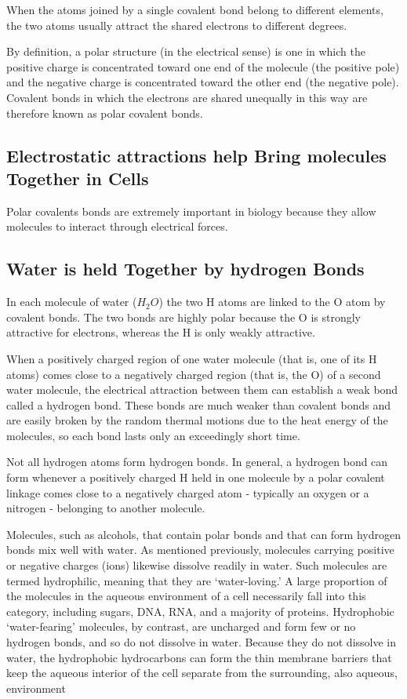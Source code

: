 When the atoms joined by a single covalent bond belong to different elements, 
the two atoms usually attract the shared electrons to different degrees.

By definition, a polar structure (in the electrical sense) is one in which the 
positive charge is concentrated toward
one end of the molecule (the positive pole) and the negative charge is
concentrated toward the other end (the negative pole). Covalent bonds
in which the electrons are shared unequally in this way are therefore
known as polar covalent bonds.

\subsection{Electrostatic attractions help Bring molecules Together in Cells}

Polar covalents bonds are extremely important in biology because they allow 
molecules to interact through electrical forces.

\subsection{Water is held Together by hydrogen Bonds}

In each molecule of water ($H_{2}O$) the two H atoms are linked to the O
atom by covalent bonds. The two bonds are highly polar because the O is
strongly attractive for electrons, whereas the H is only weakly attractive.

When a positively charged
region of one water molecule (that is, one of its H atoms) comes close to
a negatively charged region (that is, the O) of a second water molecule,
the electrical attraction between them can establish a weak bond called a
hydrogen bond. These bonds are much weaker than covalent bonds and
are easily broken by the random thermal motions due to the heat energy
of the molecules, so each bond lasts only an exceedingly short time.

Not all hydrogen atoms form hydrogen bonds. In general, a hydrogen
bond can form whenever a positively charged H held in one molecule by
a polar covalent linkage comes close to a negatively charged atom - typically 
an oxygen or a nitrogen - belonging to another molecule.

Molecules, such as alcohols, that contain polar bonds and that can form
hydrogen bonds mix well with water. As mentioned previously, molecules 
carrying positive or negative charges (ions) likewise dissolve
readily in water. Such molecules are termed hydrophilic, meaning that
they are ‘water-loving.’ A large proportion of the molecules in the aqueous 
environment of a cell necessarily fall into this category, including
sugars, DNA, RNA, and a majority of proteins. Hydrophobic ‘water-fearing’ 
molecules, by contrast, are uncharged and form few or no hydrogen
bonds, and so do not dissolve in water.
Because
they do not dissolve in water, the hydrophobic hydrocarbons can form
the thin membrane barriers that keep the aqueous interior of the cell
separate from the surrounding, also aqueous, environment

